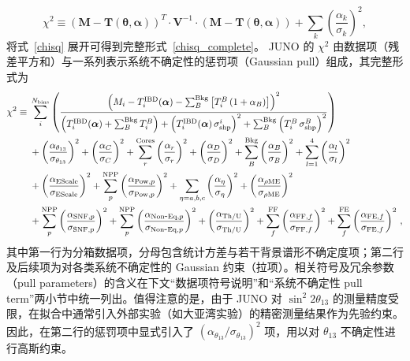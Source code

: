 \begin{equation}
  \chi^2 \equiv(\boldsymbol{M}-\boldsymbol{T}(\boldsymbol{\theta}, \boldsymbol{\alpha}))^T \cdot \boldsymbol{V}^{-1} \cdot(\boldsymbol{M}-\boldsymbol{T}(\boldsymbol{\theta}, \boldsymbol{\alpha}))+\sum_k\left(\frac{\alpha_k}{\sigma_k}\right)^2,
  \label{chisq}
  \end{equation}
将式~\ref{chisq} 展开可得到完整形式~\ref{chisq_complete}。
JUNO 的 $\chi^2$ 由数据项（残差平方和）与一系列表示系统不确定性的惩罚项（Gaussian pull）组成，其完整形式为
\begin{equation}
\begin{aligned}
\chi^2 \equiv\; & \sum_i^{N_{\rm bins}}\left(\frac{\left(M_i-T_i^{\mathrm{IBD}}(\boldsymbol{\alpha})-\sum_B^{\mathrm{Bkg}}\left[T_i^B \left(1+\alpha_B\right)\right]\right)^2}{\left(T_i^{\mathrm{IBD}}(\boldsymbol{\alpha})+\sum_B^{\mathrm{Bkg}} T_i^B\right)+\left(T_i^{\mathrm{IBD}}(\boldsymbol{\alpha}) \, \sigma_{\mathrm{shp}}^i\right)^2+\sum_B^{\mathrm{Bkg}}\left(T_i^B \, \sigma_{\mathrm{shp}}^B\right)^2}\right) \\
& + \left(\frac{\alpha_{\theta_{13}}}{\sigma_{\theta_{13}}}\right)^2
  + \left(\frac{\alpha_C}{\sigma_C}\right)^2
  + \sum_{r}^{\mathrm{Cores}}\left(\frac{\alpha_r}{\sigma_r}\right)^2
  + \left(\frac{\alpha_D}{\sigma_D}\right)^2
  + \sum_B^{\mathrm{Bkg}}\left(\frac{\alpha_B}{\sigma_B}\right)^2
  + \sum_{l=1}^4\left(\frac{\alpha_l}{\sigma_l}\right)^2 \\
& + \left(\frac{\alpha_{\mathrm{EScale}}}{\sigma_{\mathrm{EScale}}}\right)^2
  + \sum_{p}^{\mathrm{NPP}}\left(\frac{\alpha_{{\mathrm{Pow}},p}}{\sigma_{{\mathrm{Pow}},p}}\right)^2
  + \sum_{\eta=a, b, c}\left(\frac{\alpha_\eta}{\sigma_\eta}\right)^2
  + \left(\frac{\alpha_{\rho \mathrm{ME}}}{\sigma_{\rho \mathrm{ME}}}\right)^2 \\
& + \sum_{p}^{\mathrm{NPP}}\left(\frac{\alpha_{\mathrm{SNF},p}}{\sigma_{\mathrm{SNF},p}}\right)^2
  + \sum_{p}^{\mathrm{NPP}}\left(\frac{\alpha_{\mathrm{Non\mbox{-}Eq},p}}{\sigma_{\mathrm{Non\mbox{-}Eq},p}}\right)^2
  + \left(\frac{\alpha_{\mathrm{Th/U}}}{\sigma_{\mathrm{Th/U}}}\right)^2
  + \sum_{f}^{\mathrm{FF}}\left(\frac{\alpha_{{\mathrm{FF}},f}}{\sigma_{{\mathrm{FF}},f}}\right)^2
  + \sum_{f}^{\mathrm{FE}}\left(\frac{\alpha_{{\mathrm{FE}},f}}{\sigma_{{\mathrm{FE}},f}}\right)^2 \, ,
\end{aligned}
\label{chisq_complete}
\end{equation}
其中第一行为分箱数据项，分母包含统计方差与若干背景谱形不确定度项；第二行及后续项为对各类系统不确定性的 Gaussian 约束（拉项）。相关符号及冗余参数（pull parameters）的含义在下文“数据项符号说明”和“系统不确定性 pull term”两小节中统一列出。值得注意的是，由于 JUNO 对 $\sin^2 2\theta_{13}$ 的测量精度受限，在拟合中通常引入外部实验（如大亚湾实验）的精密测量结果作为先验约束。因此，在第二行的惩罚项中显式引入了 $\left(\alpha_{\theta_{13}}/\sigma_{\theta_{13}}\right)^2$ 项，用以对 $\theta_{13}$ 不确定性进行高斯约束。
